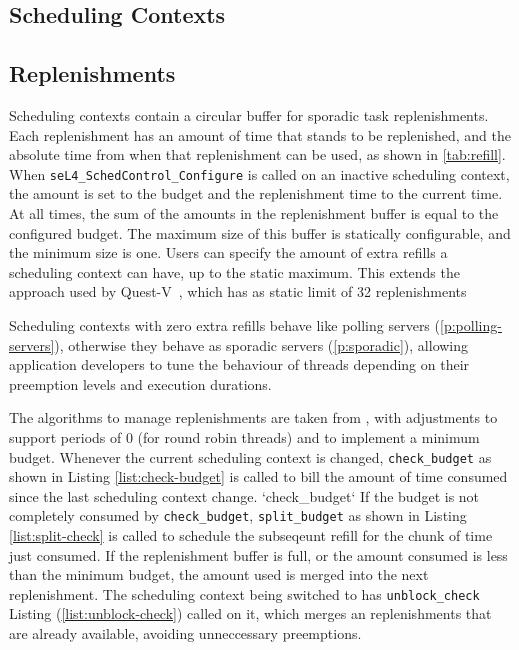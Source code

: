 \subsection{Scheduling Contexts}
\label{sec:schedcontext}

\subsection{Replenishments}
\label{sec:replenishments}

Scheduling contexts contain a circular buffer for sporadic task replenishments.
Each replenishment has an amount of time that stands to be replenished, and the absolute time from when that replenishment can be used, as shown in \cref{tab:refill}.
When \texttt{seL4\_SchedControl\_Configure} is called on an inactive scheduling context, the amount is set to the budget and the replenishment time to the current time.
At all times, the sum of the amounts in the replenishment buffer is equal to the configured budget.
The maximum size of this buffer is statically configurable, and the minimum size is one.
Users can specify the amount of extra refills a scheduling context can have, up to the static maximum.
This extends the approach used by Quest-V~\citep{Danish_LW_11}, which has as static limit of 32
replenishments %


Scheduling contexts with zero extra refills behave like polling servers (\cref{p:polling-servers}), otherwise they behave as sporadic servers (\cref{p:sporadic}), allowing application developers to tune the behaviour of threads depending on their preemption levels and execution durations.

The algorithms to manage replenishments are taken from \citet{Danish_LW_11}, with adjustments to support periods of 0 (for round robin threads) and to implement a minimum budget.
Whenever the current scheduling context is changed, \texttt{check\_budget} as shown in Listing \ref{list:check-budget} is called to bill the amount of time consumed since the last scheduling context change.
`check\_budget`
If the budget is not completely consumed by \texttt{check\_budget}, \texttt{split\_budget} as shown in Listing \ref{list:split-check} is called to schedule the subseqeunt refill for the chunk of time just consumed.
If the replenishment buffer is full, or the amount consumed is less than the minimum budget, the amount used is merged into the next replenishment.
The scheduling context being switched to has \texttt{unblock\_check} Listing (\ref{list:unblock-check}) called on it, which merges an replenishments that are already available, avoiding unneccessary preemptions.

